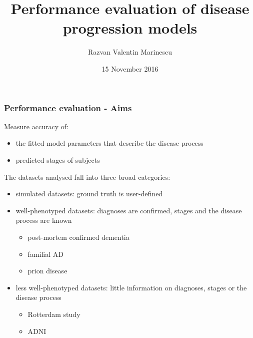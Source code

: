 \documentclass[10pt,xcolor=table]{beamer}
\title{Performance evaluation of disease progression models}
\author{Razvan Valentin Marinescu}
\institute{Center for Medical Image Computing, University College London}
\date{15 November 2016}
\begin{document}
 
\frame{\titlepage}
 


\begin{frame}
\frametitle{Performance evaluation - Aims}

Measure accuracy of: 
\begin{itemize}
  \item \textcolor{parCol}{the fitted model parameters that describe the disease process}
  \item \textcolor{stCol}{predicted stages of subjects}
\end{itemize}

The datasets analysed fall into three broad categories:
\begin{itemize}
 \item simulated datasets: ground truth is user-defined
 \item well-phenotyped datasets: diagnoses are confirmed, stages and the disease process are known
 \begin{itemize}
      \item post-mortem confirmed dementia
      \item familial AD 
      \item prion disease 
 \end{itemize} 
 \item less well-phenotyped datasets: little information on diagnoses, stages or the disease process
 \begin{itemize}
      \item Rotterdam study
      \item ADNI
 \end{itemize} 
 
\end{itemize}

\end{frame}
\end{document}
